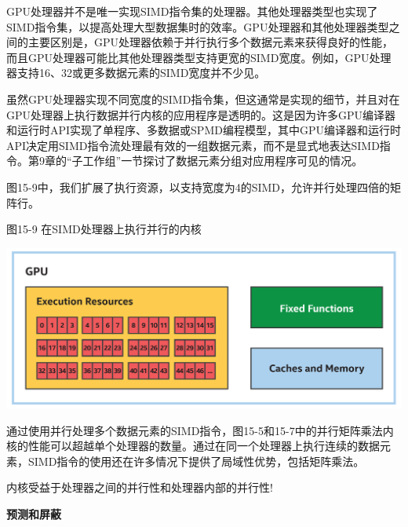 GPU处理器并不是唯一实现SIMD指令集的处理器。其他处理器类型也实现了SIMD指令集，以提高处理大型数据集时的效率。GPU处理器和其他处理器类型之间的主要区别是，GPU处理器依赖于并行执行多个数据元素来获得良好的性能，而且GPU处理器可能比其他处理器类型支持更宽的SIMD宽度。例如，GPU处理器支持16、32或更多数据元素的SIMD宽度并不少见。\par

\begin{tcolorbox}[colback=blue!5!white,colframe=blue!75!black, title=编程模型:SPMD和SIMD]
虽然GPU处理器实现不同宽度的SIMD指令集，但这通常是实现的细节，并且对在GPU处理器上执行数据并行内核的应用程序是透明的。这是因为许多GPU编译器和运行时API实现了单程序、多数据或SPMD编程模型，其中GPU编译器和运行时API决定用SIMD指令流处理最有效的一组数据元素，而不是显式地表达SIMD指令。第9章的“子工作组”一节探讨了数据元素分组对应用程序可见的情况。
\end{tcolorbox}

图15-9中，我们扩展了执行资源，以支持宽度为4的SIMD，允许并行处理四倍的矩阵行。\par

\hspace*{\fill} \par %
图15-9 在SIMD处理器上执行并行的内核
\begin{center}
	\includegraphics[width=1.0\textwidth]{content/chapter-15/images/7}
\end{center}

通过使用并行处理多个数据元素的SIMD指令，图15-5和15-7中的并行矩阵乘法内核的性能可以超越单个处理器的数量。通过在同一个处理器上执行连续的数据元素，SIMD指令的使用还在许多情况下提供了局域性优势，包括矩阵乘法。\par

\begin{tcolorbox}[colback=red!5!white,colframe=red!75!black]
内核受益于处理器之间的并行性和处理器内部的并行性!
\end{tcolorbox}

\hspace*{\fill} \par %
\textbf{预测和屏蔽}

